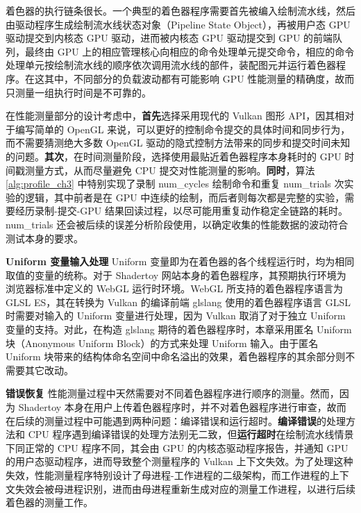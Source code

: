 { 着色器的执行链条很长。一个典型的着色器程序需要首先被编入绘制流水线，然后由驱动程序生成绘制流水线状态对象（Pipeline State Object），再被用户态 GPU 驱动提交到内核态 GPU 驱动，进而被内核态 GPU 驱动提交到 GPU 的前端队列，最终由 GPU 上的相应管理核心向相应的命令处理单元提交命令，相应的命令处理单元按绘制流水线的顺序依次调用流水线的部件，装配图元并运行着色器程序。在这其中，不同部分的负载波动都有可能影响 GPU 性能测量的精确度，故而只测量一组执行时间是不可靠的。

在性能测量部分的设计考虑中，{\bf 首先}选择采用现代的 Vulkan 图形 API，因其相对于编写简单的 OpenGL 来说，可以更好的控制命令提交的具体时间和同步行为，而不需要猜测绝大多数 OpenGL 驱动的隐式控制方法带来的同步和提交时间未知的问题。{\bf 其次}，在时间测量阶段，选择使用最贴近着色器程序本身耗时的 GPU 时间戳测量方式，从而尽量避免 CPU 提交对性能测量的影响。{\bf 同时}，算法 \ref{alg:profile_ch3} 中特别实现了录制 {num\_cycles} 绘制命令和重复 {num\_trials} 次实验的逻辑，其中前者是在 GPU 中连续的绘制，而后者则每次都是完整的实验，需要经历录制-提交-GPU 结果回读过程，以尽可能用重复动作稳定全链路的耗时。{num\_trials} 还会被后续的误差分析阶段使用，以确定收集的性能数据的波动符合测试本身的要求。

{\bf Uniform 变量输入处理} {\amend Uniform 变量即为在着色器的各个线程运行时，均为相同取值的变量的统称。}对于 Shadertoy 网站本身的着色器程序，其预期执行环境为浏览器标准中定义的 WebGL 运行时环境\cite{WebGL}。WebGL 所支持的着色器程序语言为 GLSL ES，其在转换为 Vulkan 的编译前端 glslang 使用的着色器程序语言 GLSL 时需要对输入的 Uniform 变量进行处理，因为 Vulkan 取消了对于独立 Uniform 变量的支持。对此，在构造 glslang 期待的着色器程序时，本章采用匿名 Uniform 块（Anonymous Uniform Block）的方式来处理 Uniform 输入。由于匿名 Uniform 块带来的结构体命名空间中命名溢出的效果，着色器程序的其余部分则不需要其它改动。

{\bf 错误恢复} 性能测量过程中天然需要对不同着色器程序进行顺序的测量。然而，因为 Shadertoy 本身在用户上传着色器程序时，并不对着色器程序进行审查，故而在后续的测量过程中可能遇到两种问题：编译错误和运行超时。{\bf 编译错误}的处理方法和 CPU 程序遇到编译错误的处理方法别无二致，但{\bf 运行超时}在绘制流水线情景下同正常的 CPU 程序不同，其会由 GPU 的内核态驱动程序报告，并通知 GPU 的用户态驱动程序，进而导致整个测量程序的 Vulkan 上下文失效。为了处理这种失效，性能测量程序特别设计了母进程-工作进程的二级架构，而工作进程的上下文失效会被母进程识别，进而由母进程重新生成对应的测量工作进程，以进行后续着色器的测量工作。

}

